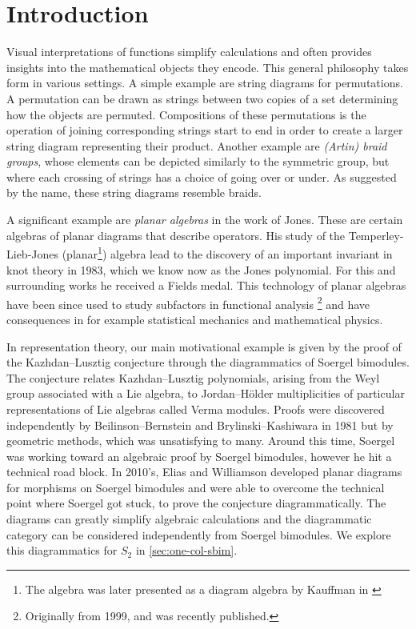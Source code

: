 \chapter{Introduction}

Visual interpretations of functions simplify calculations and often provides insights into the mathematical objects they encode.  This general philosophy takes form in various settings. A simple example are string diagrams for permutations. A permutation can be drawn as strings between two copies of a set determining how the objects are permuted. Compositions of these permutations is the operation of joining corresponding strings start to end in order to create a larger string diagram representing their product. Another example are \textit{(Artin) braid groups}, whose elements can be depicted similarly to the symmetric group, but where each crossing of strings has a choice of going over or under. As suggested by the name, these string diagrams resemble braids.

A significant example are \textit{planar algebras} in the work of Jones. These are certain algebras of planar diagrams that describe operators. His study of the Temperley-Lieb-Jones (planar\footnote{The algebra was later presented as a diagram algebra by Kauffman in \cite{kauffman-tl-planar-algebra}}) algebra lead to the discovery of an important invariant in knot theory \cite{jones-knot-polynomial} in 1983, which we know now as the Jones polynomial. For this and surrounding works he received a Fields medal. This technology of planar algebras have been since used to study subfactors in functional analysis \cite{jones-planar-algebra}\footnote{Originally from 1999, and was recently published.} and have consequences in for example statistical mechanics and mathematical physics.

In representation theory, our main motivational example is given by the proof of the Kazhdan--Lusztig conjecture through the diagrammatics of Soergel bimodules. The conjecture relates Kazhdan--Lusztig polynomials, arising from the Weyl group associated with a Lie algebra, to Jordan--H\"older multiplicities of particular representations of Lie algebras called Verma modules. Proofs were discovered independently by Beilinson--Bernstein and Brylinski--Kashiwara in 1981 but by geometric methods, which was unsatisfying to many. Around this time, Soergel was working toward an algebraic proof by Soergel bimodules, however he hit a technical road block. In 2010's, Elias and Williamson  developed planar diagrams for morphisms on Soergel bimodules and were able to overcome the technical point where Soergel got stuck, to prove the conjecture diagrammatically. The diagrams can greatly simplify algebraic calculations and the diagrammatic category can be considered independently from Soergel bimodules. We explore this diagrammatics for $S_2$ in \autoref{sec:one-col-sbim}.

